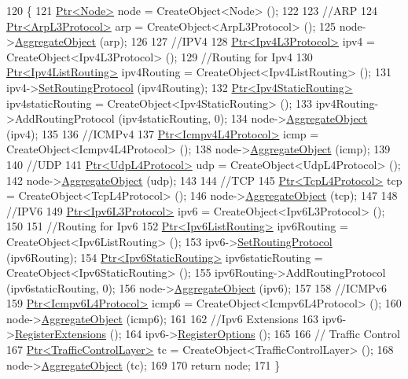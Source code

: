 \begin{DoxyCode}
120 \{
121   \hyperlink{classns3_1_1Ptr}{Ptr<Node>} node = CreateObject<Node> ();
122 
123   \textcolor{comment}{//ARP}
124   \hyperlink{classns3_1_1Ptr}{Ptr<ArpL3Protocol>} arp = CreateObject<ArpL3Protocol> ();
125   node->\hyperlink{classns3_1_1Object_a79dd435d300f3deca814553f561a2922}{AggregateObject} (arp);
126 
127   \textcolor{comment}{//IPV4}
128   \hyperlink{classns3_1_1Ptr}{Ptr<Ipv4L3Protocol>} ipv4 = CreateObject<Ipv4L3Protocol> ();
129   \textcolor{comment}{//Routing for Ipv4}
130   \hyperlink{classns3_1_1Ptr}{Ptr<Ipv4ListRouting>} ipv4Routing = CreateObject<Ipv4ListRouting> ();
131   ipv4->\hyperlink{classns3_1_1Ipv4L3Protocol_a7e7d286dc2c782ea931d12a95203fc29}{SetRoutingProtocol} (ipv4Routing);
132   \hyperlink{classns3_1_1Ptr}{Ptr<Ipv4StaticRouting>} ipv4staticRouting = CreateObject<Ipv4StaticRouting> ();
133   ipv4Routing->AddRoutingProtocol (ipv4staticRouting, 0);
134   node->\hyperlink{classns3_1_1Object_a79dd435d300f3deca814553f561a2922}{AggregateObject} (ipv4);
135 
136   \textcolor{comment}{//ICMPv4}
137   \hyperlink{classns3_1_1Ptr}{Ptr<Icmpv4L4Protocol>} icmp = CreateObject<Icmpv4L4Protocol> ();
138   node->\hyperlink{classns3_1_1Object_a79dd435d300f3deca814553f561a2922}{AggregateObject} (icmp);
139 
140   \textcolor{comment}{//UDP}
141   \hyperlink{classns3_1_1Ptr}{Ptr<UdpL4Protocol>} udp = CreateObject<UdpL4Protocol> ();
142   node->\hyperlink{classns3_1_1Object_a79dd435d300f3deca814553f561a2922}{AggregateObject} (udp);
143 
144   \textcolor{comment}{//TCP}
145   \hyperlink{classns3_1_1Ptr}{Ptr<TcpL4Protocol>} tcp = CreateObject<TcpL4Protocol> ();
146   node->\hyperlink{classns3_1_1Object_a79dd435d300f3deca814553f561a2922}{AggregateObject} (tcp);
147 
148   \textcolor{comment}{//IPV6}
149   \hyperlink{classns3_1_1Ptr}{Ptr<Ipv6L3Protocol>} ipv6 = CreateObject<Ipv6L3Protocol> ();
150 
151   \textcolor{comment}{//Routing for Ipv6}
152   \hyperlink{classns3_1_1Ptr}{Ptr<Ipv6ListRouting>} ipv6Routing = CreateObject<Ipv6ListRouting> ();
153   ipv6->\hyperlink{classns3_1_1Ipv6L3Protocol_a9f65728e13ee4a2fb5588d3601e7634f}{SetRoutingProtocol} (ipv6Routing);
154   \hyperlink{classns3_1_1Ptr}{Ptr<Ipv6StaticRouting>} ipv6staticRouting = CreateObject<Ipv6StaticRouting> ();
155   ipv6Routing->AddRoutingProtocol (ipv6staticRouting, 0);
156   node->\hyperlink{classns3_1_1Object_a79dd435d300f3deca814553f561a2922}{AggregateObject} (ipv6);
157 
158   \textcolor{comment}{//ICMPv6}
159   \hyperlink{classns3_1_1Ptr}{Ptr<Icmpv6L4Protocol>} icmp6 = CreateObject<Icmpv6L4Protocol> ();
160   node->\hyperlink{classns3_1_1Object_a79dd435d300f3deca814553f561a2922}{AggregateObject} (icmp6);
161 
162   \textcolor{comment}{//Ipv6 Extensions}
163   ipv6->\hyperlink{classns3_1_1Ipv6L3Protocol_a25cb7eac8f79c3461ec50b8464db2f8f}{RegisterExtensions} ();
164   ipv6->\hyperlink{classns3_1_1Ipv6L3Protocol_ac9c52b73b294e0b592a5034b87278d92}{RegisterOptions} ();
165 
166   \textcolor{comment}{// Traffic Control}
167   \hyperlink{classns3_1_1Ptr}{Ptr<TrafficControlLayer>} tc = CreateObject<TrafficControlLayer> ();
168   node->\hyperlink{classns3_1_1Object_a79dd435d300f3deca814553f561a2922}{AggregateObject} (tc);
169 
170   \textcolor{keywordflow}{return} node;
171 \}
\end{DoxyCode}


